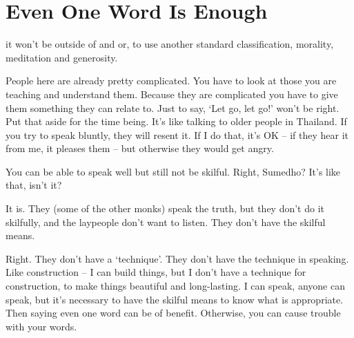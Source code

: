 
\chapter{Even One Word Is Enough}

\vspace*{0.8\baselineskip}
 it won't be outside of   and  or, to use another standard classification, morality, meditation and generosity.

People here are already pretty complicated. You have to look at those you are teaching and understand them. Because they are complicated you have to give them something they can relate to. Just to say, `Let go, let go!' won't be right. Put that aside for the time being. It's like talking to older people in Thailand. If you try to speak bluntly, they will resent it. If I do that, it's OK -- if they hear it from me, it pleases them -- but otherwise they would get angry.

You can be able to speak well but still not be skilful.  Right, Sumedho? It's like that, isn't it?

 It is. They (some of the other monks) speak the truth, but they don't do it skilfully, and the laypeople don't want to listen. They don't have the skilful means.

 Right. They don't have a `technique'. They don't have the technique in speaking. Like construction -- I can build things, but I don't have a technique for construction, to make things beautiful and \mbox{long-lasting.} I can speak, anyone can speak, but it's necessary to have the skilful means to know what is appropriate. Then saying even one word can be of benefit. Otherwise, you can cause trouble with your words.

